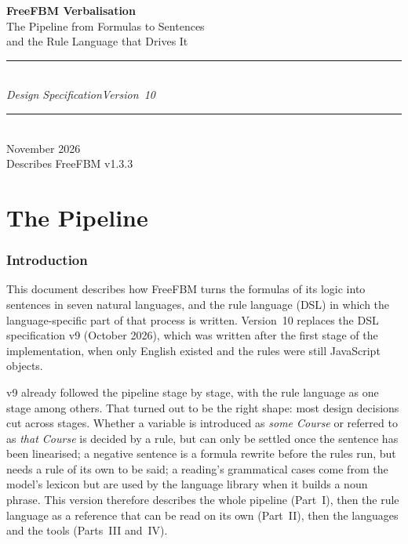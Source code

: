 \documentclass[11pt, a4paper]{article}
\begin{document}
\begin{titlepage}
  \vspace*{4cm}
  \begin{center}
    {\color{headblue}\fontsize{32}{38}\selectfont\bfseries
      FreeFBM Verbalisation}\\[0.6em]
    {\color{gray1}\Large
      The Pipeline from Formulas to Sentences}\\[0.2em]
    {\color{gray1}\Large
      and the Rule Language that Drives It}\\[2.5em]
    \textcolor{ruleblue}{\rule{0.6\textwidth}{1.5pt}}\\[0.6em]
    {\color{ruleblue}\large\itshape
      Design Specification\quad\textperiodcentered\quad Version~10}\\[0.6em]
    \textcolor{ruleblue}{\rule{0.6\textwidth}{1.5pt}}\\[3cm]
    {\color{gray1}November 2026\\[0.3em] Describes FreeFBM v1.3.3}
  \end{center}
\end{titlepage}

\tableofcontents
\clearpage

\part{The Pipeline}

\section{Introduction}

This document describes how FreeFBM turns the formulas of its logic into
sentences in seven natural languages, and the rule language (DSL) in which
the language-specific part of that process is written. Version~10 replaces
the DSL specification v9 (October 2026), which was written after the first
stage of the implementation, when only English existed and the rules were
still JavaScript objects.

v9 already followed the pipeline stage by stage, with the rule language as
one stage among others. That turned out to be the right shape: most design
decisions cut across stages. Whether a variable is introduced as
\textit{some Course} or referred to as \textit{that Course} is decided by a
rule, but can only be settled once the sentence has been linearised; a
negative sentence is a formula rewrite before the rules run, but needs a rule
of its own to be said; a reading's grammatical cases come from the model's
lexicon but are used by the language library when it builds a noun phrase.
This version therefore describes the whole pipeline (Part~I), then the rule
language as a reference that can be read on its own (Part~II), then the
languages and the tools (Parts~III and~IV).
\end{document}
